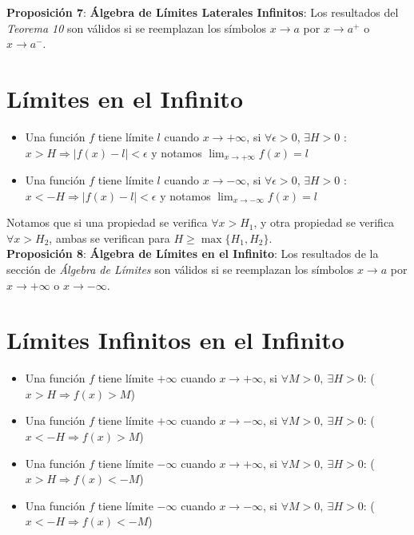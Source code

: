 \documentclass[11pt,a4paper]{article}
\begin{document}
\noindent \textbf{Proposici\'on 7}: \textbf{\'Algebra de L\'imites Laterales Infinitos}: Los resultados del \textit{Teorema 10} son v\'alidos si se reemplazan los s\'imbolos $x\rightarrow a$ por $x\rightarrow a^+$ o $x\rightarrow a^-$.

\section{L\'imites en el Infinito}
\begin{itemize}
\item Una funci\'on $f$ tiene l\'imite $l$ cuando $x \to +\infty$, si $\forall \epsilon > 0$, $\exists H > 0$ :\\ $x > H \Rightarrow |f(x)-l| < \epsilon$ y notamos $\displaystyle{\lim_{x \to +\infty} f(x) = l}$
\item Una funci\'on $f$ tiene l\'imite $l$ cuando $x \to -\infty$, si $\forall \epsilon > 0$, $\exists H > 0$ :\\ $x < -H \Rightarrow |f(x)-l| < \epsilon$ y notamos $\displaystyle{\lim_{x \to -\infty} f(x) = l}$
\end{itemize}
Notamos que si una propiedad se verifica $\forall x > H_1$, y otra propiedad se verifica $\forall x > H_2$, ambas se verifican para $H\geq\max\{H_1,H_2\}$.\\

\noindent \textbf{Proposici\'on 8}: \textbf{\'Algebra de L\'imites en el Infinito}: Los resultados de la secci\'on de \textit{\'Algebra de L\'imites} son v\'alidos si se reemplazan los s\'imbolos $x\to a$ por $x\to +\infty$ o $x\to -\infty$.

\section{L\'imites Infinitos en el Infinito}
\begin{itemize}
\item Una funci\'on $f$ tiene l\'imite $+\infty$ cuando $x\to +\infty$, si $\forall M>0,\ \exists H>0$: ($x>H \Rightarrow f(x)>M$)
\item Una funci\'on $f$ tiene l\'imite $+\infty$ cuando $x\to -\infty$, si $\forall M>0,\ \exists H>0$: ($x<-H \Rightarrow f(x)>M$)
\item Una funci\'on $f$ tiene l\'imite $-\infty$ cuando $x\to +\infty$, si $\forall M>0,\ \exists H>0$: ($x>H \Rightarrow f(x)<-M$)
\item Una funci\'on $f$ tiene l\'imite $-\infty$ cuando $x\to -\infty$, si $\forall M>0,\ \exists H>0$: ($x<-H \Rightarrow f(x)<-M$)
\end{itemize}
\end{document}
